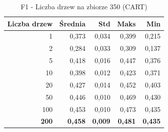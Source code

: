 \begin{table}[htbp]
\centering
\small
\setlength{\tabcolsep}{6pt}
\renewcommand{\arraystretch}{1.2}
\caption{F1 - Liczba drzew na zbiorze 350 (CART)}
\label{tab:CART_tree_count_350_f1}
\begin{tabular}{r|r|r|r|r}
\toprule
Liczba drzew & Średnia & Std & Maks & Min \\
\hline
1 & 0,373 & 0,034 & 0,399 & 0,215 \\
2 & 0,284 & 0,033 & 0,309 & 0,137 \\
5 & 0,418 & 0,016 & 0,447 & 0,376 \\
10 & 0,398 & 0,012 & 0,423 & 0,371 \\
20 & 0,427 & 0,014 & 0,452 & 0,403 \\
50 & 0,446 & 0,010 & 0,469 & 0,430 \\
100 & 0,453 & 0,010 & 0,473 & 0,435 \\
\textbf{200} & \textbf{0,458} & \textbf{0,009} & \textbf{0,481} & \textbf{0,435} \\
\bottomrule
\end{tabular}
\end{table}